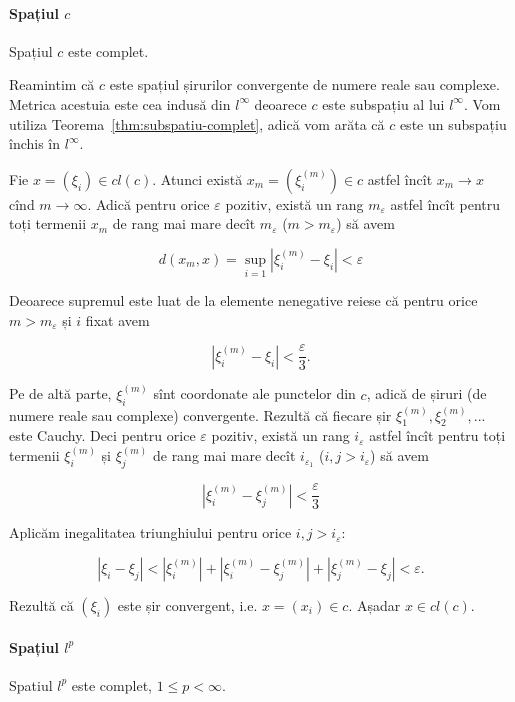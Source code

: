 \documentclass[a4paper,12pt]{article}
\theoremstyle{change}
\newenvironment{proof}[1][Proof]{\begin{trivlist}
\item[\hskip \labelsep {\bfseries #1}]}{\end{trivlist}}
\begin{document}
\paragraph{Spațiul $c$} Spațiul $c$ este complet. 

\begin{proof}
Reamintim că $c$ este spațiul șirurilor convergente de numere reale sau complexe.
Metrica acestuia este cea indusă din $l^\infty$ deoarece $c$ este subspațiu al lui $l^\infty$.
Vom utiliza Teorema~\ref{thm:subspatiu-complet}, adică vom arăta că $c$ este un subspațiu închis în $l^\infty$.

Fie $x=(\xi_i)\in cl(c)$. Atunci există $x_m=(\xi_i^{(m)})\in c$ astfel încît $x_m\to x$ cînd $m\to\infty$. Adică pentru orice $\varepsilon$ pozitiv, există un rang $m_{\varepsilon}$ astfel încît pentru toți termenii $x_m$ de rang mai mare decît $m_{\varepsilon}$ ($m>m_{\varepsilon}$) să avem

\[
  d(x_m,x) = \sup_{i=1} |\xi_i^{(m)} - \xi_i| < \varepsilon
\]

Deoarece supremul este luat de la elemente nenegative reiese că pentru orice $m>m_\varepsilon$ și $i$ fixat avem

\[
|\xi_i^{(m)} - \xi_i| < \frac{\varepsilon}{3}.
\]

Pe de altă parte, $\xi_i^{(m)}$ sînt coordonate ale punctelor din $c$, adică de șiruri (de numere reale sau complexe) convergente. Rezultă că fiecare șir $\xi_1^{(m)}, \xi_2^{(m)}, ...$ este Cauchy. Deci pentru orice $\varepsilon$ pozitiv, există un rang $i_{\varepsilon}$ astfel încît pentru toți termenii $\xi_i^{(m)}$ și $\xi_j^{(m)}$ de rang mai mare decît $i_{\varepsilon_1}$ ($i,j>i_{\varepsilon}$) să avem

\[
|\xi_i^{(m)}-\xi_j^{(m)}|<\frac{\varepsilon}{3}
\]

Aplicăm inegalitatea triunghiului pentru orice $i,j>i_\varepsilon$:

\[
|\xi_i-\xi_j|<|\xi_i^{(m)}|+|\xi_i^{(m)}-\xi_j^{(m)}|+|\xi_j^{(m)}-\xi_j|<\varepsilon.
\]

Rezultă că $(\xi_i)$ este șir convergent, i.e. $x=(x_i)\in c$. Așadar $x\in cl(c)$.
\end{proof}

\paragraph{Spațiul $l^p$} Spatiul $l^p$ este complet, $1\leq p<\infty$.
\end{document}

